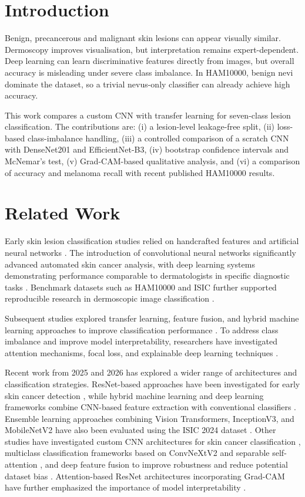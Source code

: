 \documentclass[conference]{IEEEtran}
\begin{document}
\section{Introduction}
Benign, precancerous and malignant skin lesions can appear visually similar. Dermoscopy improves visualisation, but interpretation remains expert-dependent. Deep learning can learn discriminative features directly from images, but overall accuracy is misleading under severe class imbalance. In HAM10000, benign nevi dominate the dataset, so a trivial nevus-only classifier can already achieve high accuracy.

This work compares a custom CNN with transfer learning for seven-class lesion classification. The contributions are: (i) a lesion-level leakage-free split, (ii) loss-based class-imbalance handling, (iii) a controlled comparison of a scratch CNN with DenseNet201 and EfficientNet-B3, (iv) bootstrap confidence intervals and McNemar's test, (v) Grad-CAM-based qualitative analysis, and (vi) a comparison of accuracy and melanoma recall with recent published HAM10000 results.

\section{Related Work}
Early skin lesion classification studies relied on handcrafted
features and artificial neural networks
\cite{binder1994,binder1998,rubegni2002}. The introduction of
convolutional neural networks significantly advanced automated
skin cancer analysis, with deep learning systems demonstrating
performance comparable to dermatologists in specific diagnostic
tasks \cite{esteva2017,haenssle2018,brinker2019}. Benchmark
datasets such as HAM10000 and ISIC further supported reproducible
research in dermoscopic image classification
\cite{tschandl2018,codella2018}.

Subsequent studies explored transfer learning, feature fusion,
and hybrid machine learning approaches to improve classification
performance \cite{arshad2021}. To address
class imbalance and improve model interpretability, researchers
have investigated attention mechanisms, focal loss, and
explainable deep learning techniques
\cite{nie2023,nguyen2022}.

Recent work from 2025 and 2026 has explored a wider range of architectures
and classification strategies. ResNet-based approaches have been
investigated for early skin cancer detection
\cite{resnetvision2025}, while hybrid machine learning and deep
learning frameworks combine CNN-based feature extraction with
conventional classifiers \cite{dipesh2026,kumar2025comprehensive}.
Ensemble learning approaches combining Vision Transformers,
InceptionV3, and MobileNetV2 have also been evaluated using the
ISIC 2024 dataset \cite{junaedi2025ensemble}. Other studies have
investigated custom CNN architectures for skin cancer
classification \cite{umamahesh2025}, multiclass classification
frameworks based on ConvNeXtV2 and separable self-attention
\cite{ozdemir2025}, and deep feature fusion to improve robustness
and reduce potential dataset bias \cite{abdulredah2025}.
Attention-based ResNet architectures incorporating Grad-CAM
have further emphasized the importance of model interpretability
\cite{hosny2025attention}.
\end{document}
